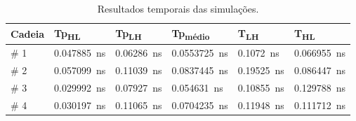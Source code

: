 \documentclass{iiufrgs}
\begin{document}

\begin{table}[ht]
    \centering
    \caption{Resultados temporais das simulações.}
    \small
    \label{tab:tempo}
    \begin{tabular}{l l l l l l}
        \hline
        Cadeia
        & Tp\textsubscript{HL}
        & Tp\textsubscript{LH}
        & Tp\textsubscript{médio}
        & T\textsubscript{LH}
        & T\textsubscript{HL} \\ \hline
        \# 1
        & \SI{0.047885}{\ns} & \SI{0.06286}{\ns} & \SI{0.0553725}{\ns} & \SI{0.1072}{\ns}
        & \SI{0.066955}{\ns} \\
        \# 2
        & \SI{0.057099}{\ns} & \SI{0.11039}{\ns} & \SI{0.0837445}{\ns} & \SI{0.19525}{\ns}
        & \SI{0.086447}{\ns} \\
        \# 3
        & \SI{0.029992}{\ns} & \SI{0.07927}{\ns} & \SI{0.054631}{\ns} & \SI{0.10855}{\ns}
        & \SI{0.129788}{\ns} \\
        \# 4
        & \SI{0.030197}{\ns} & \SI{0.11065}{\ns} & \SI{0.0704235}{\ns} & \SI{0.11948}{\ns}
        & \SI{0.111712}{\ns} \\
        \hline
    \end{tabular}
\end{table}
\end{document}

